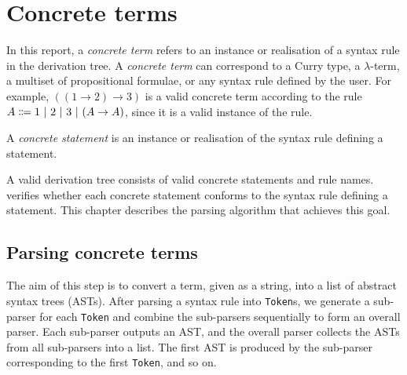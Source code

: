 \section{Concrete terms}
\label{section:term}
In this report, a \textit{concrete term} refers to an instance or realisation of a syntax rule in the derivation tree. A \textit{concrete term} can correspond to a Curry type, a $\lambda$-term, a multiset of propositional formulae, or any syntax rule defined by the user. For example, $((1 \to 2) \to 3)$ is a valid concrete term according to the rule $A \Coloneqq 1 \ |\  2 \ |\  3 \ |\  (A \to A)$, since it is a valid instance of the rule.

A \textit{concrete statement} is an instance or realisation of the syntax rule defining a statement.

A valid derivation tree consists of valid concrete statements and rule names. \projectname{} verifies whether each concrete statement conforms to the syntax rule defining a statement. This chapter describes the parsing algorithm that achieves this goal.

\subsection{Parsing concrete terms}
The aim of this step is to convert a term, given as a string, into a list of abstract syntax trees (ASTs). After parsing a syntax rule into \lstinline{Token}s, we generate a sub-parser for each \lstinline{Token} and combine the sub-parsers sequentially to form an overall parser. Each sub-parser outputs an AST, and the overall parser collects the ASTs from all sub-parsers into a list. The first AST is produced by the sub-parser corresponding to the first \lstinline{Token}, and so on.

